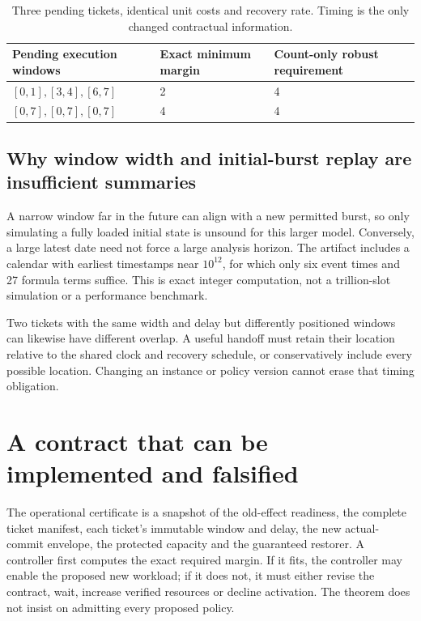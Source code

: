 \documentclass[11pt,a4paper]{article}
\theoremstyle{definition}\newtheorem{definition}{Definition}
\begin{document}
\begin{table}[ht]
\centering\small
\caption{Three pending tickets, identical unit costs and recovery rate. Timing is the only changed contractual information.}
\begin{tabularx}{\linewidth}{@{}XXX@{}}\toprule
Pending execution windows & Exact minimum margin & Count-only robust requirement\\\midrule
$[0,1],[3,4],[6,7]$ &2&4\\
$[0,7],[0,7],[0,7]$ &4&4\\\bottomrule
\end{tabularx}
\end{table}

\subsection{Why window width and initial-burst replay are insufficient summaries}
A narrow window far in the future can align with a new permitted burst, so only simulating a fully loaded initial state is unsound for this larger model. Conversely, a large latest date need not force a large analysis horizon. The artifact includes a calendar with earliest timestamps near $10^{12}$, for which only six event times and 27 formula terms suffice. This is exact integer computation, not a trillion-slot simulation or a performance benchmark.

Two tickets with the same width and delay but differently positioned windows can likewise have different overlap. A useful handoff must retain their location relative to the shared clock and recovery schedule, or conservatively include every possible location. Changing an instance or policy version cannot erase that timing obligation.

\section{A contract that can be implemented and falsified}
\label{sec:protocol}
The operational certificate is a snapshot of the old-effect readiness, the complete ticket manifest, each ticket's immutable window and delay, the new actual-commit envelope, the protected capacity and the guaranteed restorer. A controller first computes the exact required margin. If it fits, the controller may enable the proposed new workload; if it does not, it must either revise the contract, wait, increase verified resources or decline activation. The theorem does not insist on admitting every proposed policy.
\end{document}
